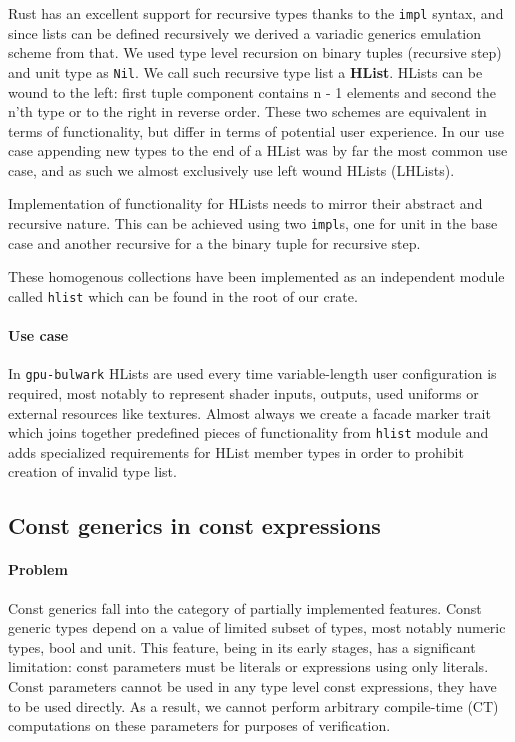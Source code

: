 Rust has an excellent support for recursive types thanks to the \texttt{impl} syntax, and since lists can be defined recursively we derived a variadic generics emulation scheme from that.
We used type level recursion on binary tuples (recursive step) and unit type as \texttt{Nil}. We call such recursive type list a \textbf{HList}.
HLists can be wound to the left: first tuple component contains n - 1 elements and second the n'th type or to the right in reverse order.
These two schemes are equivalent in terms of functionality, but differ in terms of potential user experience.
In our use case appending new types to the end of a HList was by far the most common use case, and as such we almost exclusively use left wound HLists (LHLists).

Implementation of functionality for HLists needs to mirror their abstract and recursive nature. This can be achieved using two \texttt{impl}s, 
one for unit in the base case and another recursive for a the binary tuple for recursive step.

These homogenous collections have been implemented as an independent module called \texttt{hlist} which can be found in the root of our crate.
 
\paragraph{Use case}

In \texttt{gpu-bulwark} HLists are used every time variable-length user configuration is required, most notably to represent shader inputs, outputs, used uniforms or external resources like textures.
Almost always we create a facade marker trait which joins together predefined pieces of functionality from \texttt{hlist} module
and adds specialized requirements for HList member types in order to prohibit creation of invalid type list.

\subsection{Const generics in const expressions}

\paragraph{Problem}

Const generics fall into the category of partially implemented features. Const generic types depend on a value of limited subset of types, most notably numeric types, bool and unit.
This feature, being in its early stages, has a significant limitation: const parameters must be literals or expressions using only literals. 
Const parameters cannot be used in any type level const expressions, they have to be used directly. 
As a result, we cannot perform arbitrary compile-time (CT) computations on these parameters for purposes of verification.

